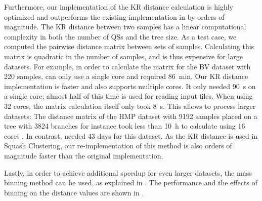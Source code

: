 Furthermore, %
our implementation of the KR distance calculation is highly optimized and
outperforms the existing implementation in  \cite{Matsen2010} by orders of magnitude.
The KR distance between two samples has a linear computational complexity in both the number of \acp{QS} and the tree size.
As a test case, we computed the pairwise distance matrix between sets of samples.
Calculating this matrix is quadratic in the number of samples,
and is thus expensive for large datasets.
For example, in order to calculate the matrix for the \ac{BV} dataset with \num{220} samples,
 can only use a single core and required \SI{86}{\minute}.
Our KR distance implementation  is faster and also supports multiple cores.
It only needed \SI{90}{\second} on a single core; almost half of this time is used for reading input files.
When using \num{32} cores, the matrix calculation itself only took \SI{8}{\second}.
This allows to process larger datasets:
The distance matrix of the \ac{HMP} dataset with \num{9 192} samples placed on a tree with \num{3 824} branches
for instance took less than \SI{10}{\hour} to calculate using \num{16} cores .
In contrast,  needed \num{43} days for this dataset.
As the KR distance is used in Squash Clustering, our re-implementation of this method
is also orders of magnitude faster than the original  implementation.

Lastly, in order to achieve additional speedup for even larger datasets, the mass binning method can be used,
as explained in .
The performance and the effects of binning on the distance values are shown in .

